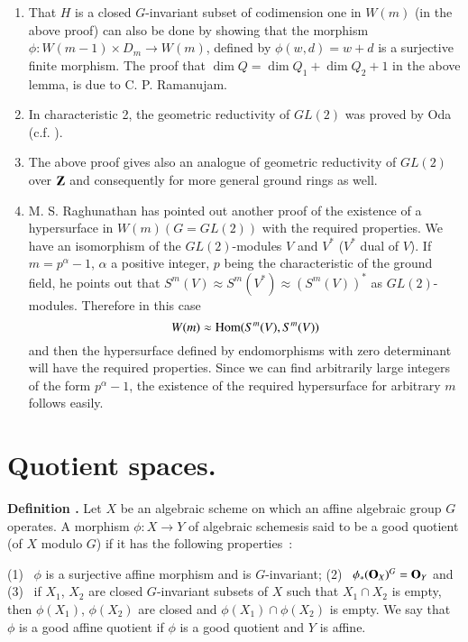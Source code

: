 \begin{remarks*}
\begin{enumerate}
\renewcommand{\labelenumi}{(\theenumi)}
\item That $H$ is a closed $G$-invariant subset of codimension one in $W(m)$ (in the above proof) can also be done by showing that the morphism $\phi:W(m-1)\times D_{m}\to W(m)$, defined by $\phi(w,d)=w+d$ is a surjective finite morphism. The proof that $\dim Q=\dim Q_{1}+\dim Q_{2}+1$ in the above lemma, is due to C. P. Ramanujam.

\item In characteristic 2, the geometric reductivity of $GL(2)$ was proved by Oda (c.f. \cite{art18-key9}).

\item The above proof gives also an analogue of geometric reductivity of $GL(2)$ over $\mathbf{Z}$ and consequently for more general ground rings as well.

\item M. S. Raghunathan has pointed out another proof of the existence of a hypersurface in $W(m)(G=GL(2))$ with the required properties. We have an isomorphism of the $GL(2)$-modules $V$ and $V^{*}$ ($V^{*}$ dual of $V$). If $m=p^{\alpha}-1$, $\alpha$ a positive integer, $p$ being the characteristic of the ground field, he points out that $S^{m}(V)\approx S^{m}(V^{*})\approx (S^{m}(V))^{*}$ as $GL(2)$-modules. Therefore in this case
$$
W(m)\approx \operatorname{\mathrm{Hom}} (S^{m}(V),S^{m}(V))
$$
and then the hypersurface defined by endomorphisms with zero determinant will have the required properties. Since we can find arbitrarily large integers of the form $p^{\alpha}-1$, the existence of the required hypersurface for arbitrary $m$ follows easily.
\end{enumerate}
\end{remarks*}

\section{Quotient spaces.}\label{art18-sec2}

\noindent
{\bf Definition .\label{art18-defi4}}
Let $X$ be an algebraic scheme on which an affine algebraic group $G$ operates. A morphism $\phi : X\to Y$ of algebraic schemes\pageoriginale is said to be a good quotient (of $X$ modulo $G$) if it has the following properties~:

\smallskip
\noindent
{\rm(1)}~ $\phi$ is a surjective affine morphism and is $G$-invariant; {\rm(2)}~ $\phi_{*}(\mathbf{O}_{X})^{G}=\mathbf{O}_{Y}$ and 
{\rm(3)}~ if $X_{1}$, $X_{2}$ are closed $G$-invariant subsets of $X$ such that $X_{1}\cap X_{2}$ is empty, then $\phi(X_{1})$, $\phi(X_{2})$ are closed and $\phi(X_{1})\cap \phi(X_{2})$ is empty. We say that $\phi$ is a good affine quotient if $\phi$ is a good quotient and $Y$ is affine.
\smallskip

